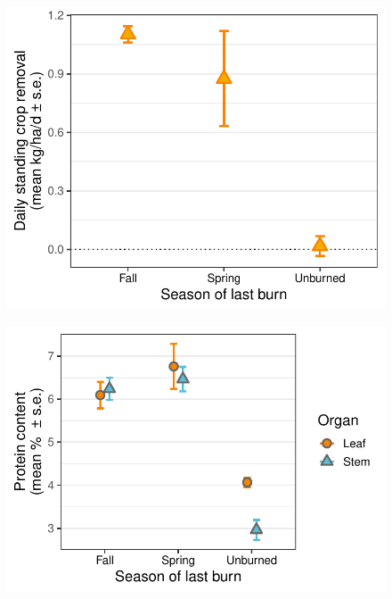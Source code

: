 \documentclass[referee, 
	            sn-basic]
           {sn-jnl}
\begin{document}
\begin{linenumbers}
\begin{figure}
	\centering
	\includegraphics{removal_gg-1.pdf}
	\caption{ }%
	\label{removal} %
\end{figure}

\begin{figure}
	\centering
	\includegraphics{value_gg-1.pdf}
	\caption{ } %
	\label{value} %
\end{figure}


\end{linenumbers}
\end{document}
